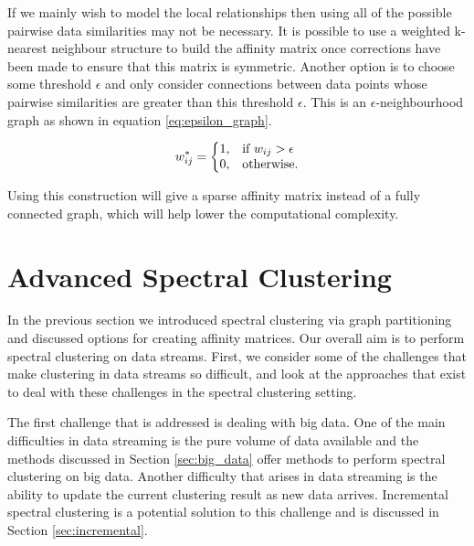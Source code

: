 If we mainly wish to model the local relationships then using all of the possible pairwise data similarities may not be necessary. It is possible to use a weighted k-nearest neighbour structure \citep{Luxburg2008} to build the affinity matrix once corrections have been made to ensure that this matrix is symmetric. Another option is to choose some threshold $\epsilon$ and only consider connections between data points whose pairwise similarities are greater  than this threshold $\epsilon$. This is an $\epsilon$-neighbourhood graph as shown in equation \eqref{eq:epsilon_graph}. 


\begin{equation}
\label{eq:epsilon_graph}
  w^*_{ij}=\left\{
  \begin{array}{@{}ll@{}}
    1, & \text{if}\ w_{ij} > \epsilon \\
    0, & \text{otherwise.}
  \end{array}\right.
\end{equation} 

Using this construction will give a sparse affinity matrix instead of a fully connected graph, which will help lower the computational complexity. 

\section{Advanced Spectral Clustering}
\label{sec:ad_spec}

In the previous section we introduced spectral clustering via graph partitioning and discussed options for creating affinity matrices. Our overall aim is to perform spectral clustering on data streams. First, we consider some of the challenges that make clustering in data streams so difficult, and look at the approaches that exist to deal with these challenges in the spectral clustering setting.

 The first challenge that is addressed is dealing with big data. One of the main difficulties in data streaming is the pure volume of data available and the methods discussed in Section \ref{sec:big_data} offer methods to perform spectral clustering on big data.  Another difficulty that arises in data streaming is the ability to update the current clustering result  as new data arrives.  Incremental spectral clustering is a potential solution to this challenge and is discussed in Section \ref{sec:incremental}.


